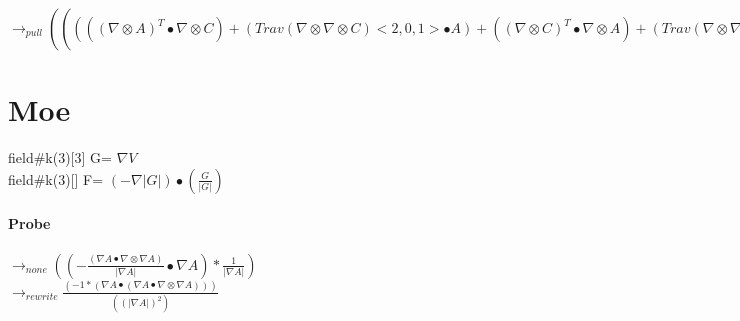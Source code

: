 \documentclass{article}
\begin{document}
\newline $\rightarrow_{pull}((((( \nabla  \otimes A)^T \bullet  \nabla  \otimes C)+(Trav( \nabla  \otimes  \nabla  \otimes C)<2,0,1> \bullet A)+(( \nabla  \otimes C)^T \bullet  \nabla  \otimes A)+(Trav( \nabla  \otimes  \nabla  \otimes A)<2,0,1> \bullet C))* \frac{1}{(|C|*|A|)}+(((C \bullet A)*((A \bullet  \nabla  \otimes A) \otimes (A \bullet  \nabla  \otimes A)))+(2*(C \bullet A)*((A \bullet  \nabla  \otimes A) \otimes (A \bullet  \nabla  \otimes A))))* \frac{1}{(|A|*|C|*((A \bullet A))^2)}+((((C \bullet A)*((A \bullet  \nabla  \otimes A)*(C \bullet  \nabla  \otimes C))))^T+((C \bullet A)*((A \bullet  \nabla  \otimes A) \otimes (C \bullet  \nabla  \otimes C))))* \frac{1}{((C \bullet C)*|A|*|C|*(A \bullet A))}+((C \bullet A)*((C \bullet  \nabla  \otimes C) \otimes (C \bullet  \nabla  \otimes C)))* \frac{1}{(|C|*|A|*((C \bullet C))^2)}+(2*|C|*(C \bullet A)*((C \bullet  \nabla  \otimes C) \otimes (C \bullet  \nabla  \otimes C)))* \frac{1}{(|A|*(C \bullet C)*((C \bullet C))^2)})-(((((((((( \nabla  \otimes C)^T \bullet A) \otimes (A \bullet  \nabla  \otimes A)))+((C \bullet A)*(A \bullet  \nabla  \otimes  \nabla  \otimes A)))+((C \bullet A)*(( \nabla  \otimes A)^T \bullet  \nabla  \otimes A)))+((((( \nabla  \otimes C)^T \bullet A)*(A \bullet  \nabla  \otimes A))))^T)+((((C \bullet  \nabla  \otimes A)*(A \bullet  \nabla  \otimes A))))^T)+(((C \bullet  \nabla  \otimes A) \otimes (A \bullet  \nabla  \otimes A))))* \frac{1}{(|C|*|A|*(A \bullet A))}+(((((((( \nabla  \otimes C)^T \bullet A)*(C \bullet  \nabla  \otimes C))))^T+(((( \nabla  \otimes C)^T \bullet A) \otimes (C \bullet  \nabla  \otimes C))))+((((C \bullet  \nabla  \otimes A)*(C \bullet  \nabla  \otimes C))))^T)+(((( \nabla  \otimes A)^T \bullet C) \otimes (C \bullet  \nabla  \otimes C))))* \frac{1}{(|A|*|C|*(C \bullet C))}+((|C|*(C \bullet A)*(( \nabla  \otimes C)^T \bullet  \nabla  \otimes C))+(|C|*(C \bullet A)*(C \bullet  \nabla  \otimes  \nabla  \otimes C)))* \frac{1}{(|A|*(C \bullet C)*(C \bullet C))}))$

\newpage
 \section{Moe}
   field\#k(3)[3] G= $\nabla V$\\
 field\#k(3)[] F= $(-\nabla|G|)\bullet(\frac{G}{|G|})$
\paragraph{Probe} 
$\rightarrow_{none} ((-{ \frac{( \nabla A \bullet  \nabla  \otimes  \nabla A)}{| \nabla A|}} \bullet  \nabla A)* \frac{1}{| \nabla A|})$
 \\ \newline $\rightarrow_{rewrite} \frac{(-1*( \nabla A \bullet ( \nabla A \bullet  \nabla  \otimes  \nabla A)))}{((| \nabla A|)^2)}$
\end{document}
